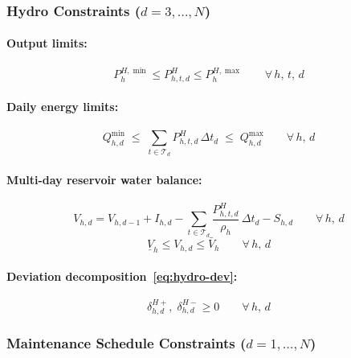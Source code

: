 \documentclass[11pt]{article}
\begin{document}
\subsubsection{Hydro Constraints ($d = 3,\ldots,N$)}

\paragraph{Output limits:}
\begin{equation}\label{eq:s1-hydro-lim}
  P^{H,\min}_h \leq P^{H}_{h,t,d} \leq P^{H,\max}_h
  \qquad \forall\, h,\,t,\,d
\end{equation}

\paragraph{Daily energy limits:}
\begin{equation}\label{eq:s1-hydro-energy}
  Q^{\min}_{h,d} \;\leq\;
  \sum_{t \in \mathcal{T}_d} P^{H}_{h,t,d}\,\Delta t_d
  \;\leq\; Q^{\max}_{h,d}
  \qquad \forall\, h,\, d
\end{equation}

\paragraph{Multi-day reservoir water balance:}
\begin{equation}\label{eq:s1-hydro-wl}
  V_{h,d} = V_{h,d-1} + I_{h,d}
  - \sum_{t \in \mathcal{T}_d}
  \frac{P^{H}_{h,t,d}}{\rho_h}\,\Delta t_d
  - S_{h,d}
  \qquad \forall\, h,\, d
\end{equation}
\begin{equation}\label{eq:s1-hydro-vol}
  \underline{V}_h \leq V_{h,d} \leq \bar{V}_h
  \qquad \forall\, h,\, d
\end{equation}

\paragraph{Deviation decomposition~\eqref{eq:hydro-dev}:}
\begin{equation}\label{eq:s1-hydro-dev-constraint}
  \delta^{H+}_{h,d},\;\delta^{H-}_{h,d} \geq 0 \qquad \forall\, h,\,d
\end{equation}

\subsubsection{Maintenance Schedule Constraints ($d = 1,\ldots,N$)}
\end{document}
